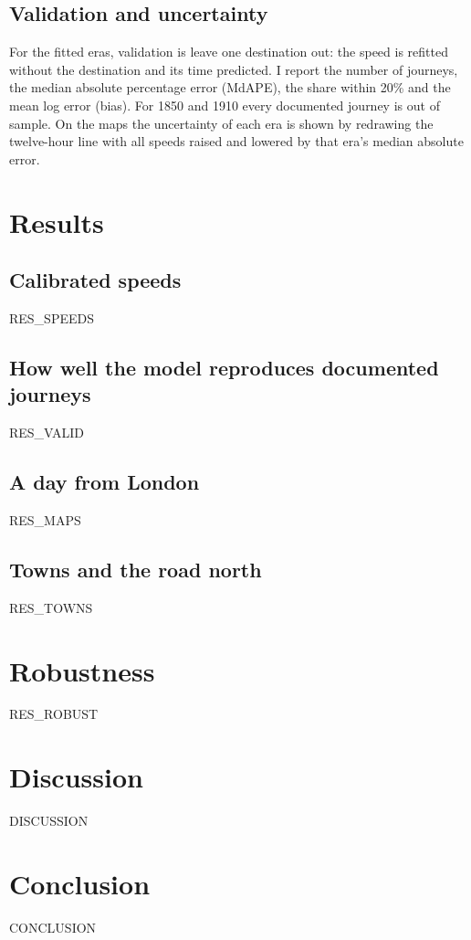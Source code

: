 \subsection{Validation and uncertainty}
For the fitted eras, validation is leave one destination out: the speed is refitted without the destination and its time predicted. I report the number of journeys, the median absolute percentage error (MdAPE), the share within 20\% and the mean log error (bias). For 1850 and 1910 every documented journey is out of sample. On the maps the uncertainty of each era is shown by redrawing the twelve-hour line with all speeds raised and lowered by that era's median absolute error.

\section{Results}\label{sec:results}
\subsection{Calibrated speeds}
{{RES_SPEEDS}}

\subsection{How well the model reproduces documented journeys}
{{RES_VALID}}

\subsection{A day from London}
{{RES_MAPS}}

\subsection{Towns and the road north}
{{RES_TOWNS}}

\section{Robustness}\label{sec:robust}
{{RES_ROBUST}}

\section{Discussion}\label{sec:disc}
{{DISCUSSION}}

\section{Conclusion}\label{sec:conc}
{{CONCLUSION}}
